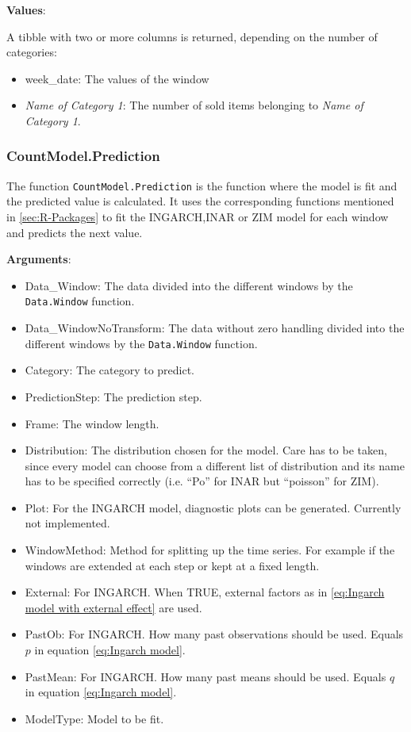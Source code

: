 \textbf{Values}:

A tibble with two or more columns is returned, depending on the number of categories: 

\begin{itemize}
	\item week\_date: The values of the window
	\item \textit{Name of Category 1}: The number of sold items belonging to \textit{Name of Category 1}.
\end{itemize}

\subsubsection{CountModel.Prediction}
\label{sec:CountModel.Prediction}

The function \texttt{CountModel.Prediction} is the function where the model is fit and the predicted value is calculated. It uses the corresponding functions mentioned in \ref{sec:R-Packages} to fit the INGARCH,INAR or ZIM model for each window and predicts the next value. 

\textbf{Arguments}:

\begin{itemize}
	\item Data\_Window: The data divided into the different windows by the \texttt{Data.Window} function.
	\item Data\_WindowNoTransform: The data without zero handling divided into the different windows by the \texttt{Data.Window} function.
  \item Category: The category to predict. 
  \item PredictionStep: The prediction step.
  \item Frame: The window length.
  \item Distribution: The distribution chosen for the model. Care has to be taken, since every model can choose from a different list of distribution and its name has to be specified correctly (i.e. "`Po"' for INAR but "`poisson"' for ZIM). 
  \item Plot: For the INGARCH model, diagnostic plots can be generated. Currently not implemented.
  \item WindowMethod: Method for splitting up the time series. For example if the windows are extended at each step or kept at a fixed length.
  \item External: For INGARCH. When TRUE, external factors as in \ref{eq:Ingarch model with external effect} are used.
  \item PastOb: For INGARCH. How many past observations should be used. Equals $p$ in equation \ref{eq:Ingarch model}.
  \item PastMean: For INGARCH. How many past means should be used. Equals $q$ in equation \ref{eq:Ingarch model}.
  \item ModelType: Model to be fit. 
\end{itemize}

